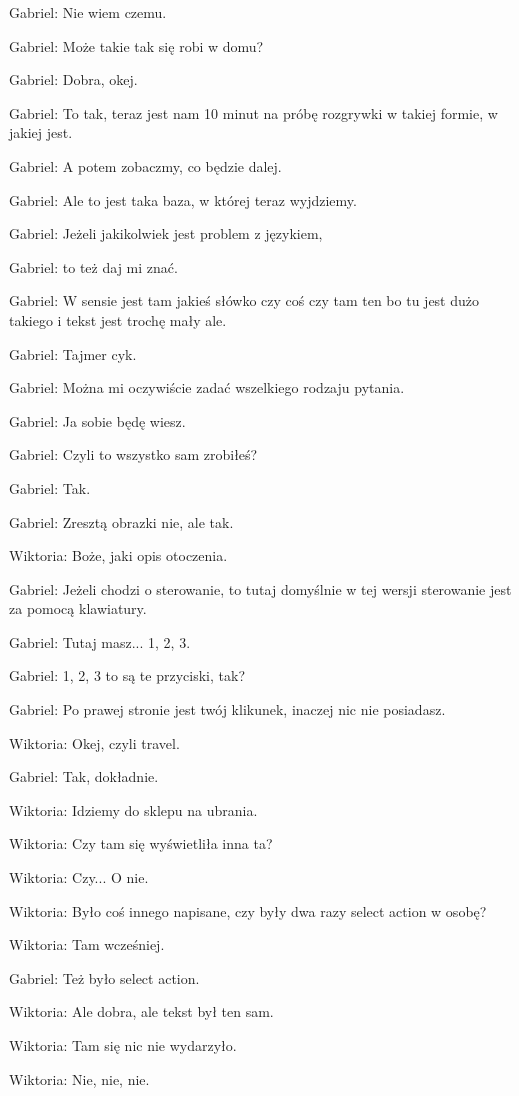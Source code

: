 Gabriel: Nie wiem czemu.

Gabriel: Może takie tak się robi w domu?

Gabriel: Dobra, okej.

Gabriel: To tak, teraz jest nam 10 minut na próbę rozgrywki w takiej formie, w jakiej jest.

Gabriel: A potem zobaczmy, co będzie dalej.

Gabriel: Ale to jest taka baza, w której teraz wyjdziemy.

Gabriel: Jeżeli jakikolwiek jest problem z językiem,

Gabriel: to też daj mi znać.

Gabriel: W sensie jest tam jakieś słówko czy coś czy tam ten bo tu jest dużo takiego i tekst jest trochę mały ale.

Gabriel: Tajmer cyk.

Gabriel: Można mi oczywiście zadać wszelkiego rodzaju pytania.

Gabriel: Ja sobie będę wiesz.

Gabriel: Czyli to wszystko sam zrobiłeś?

Gabriel: Tak.

Gabriel: Zresztą obrazki nie, ale tak.

Wiktoria: Boże, jaki opis otoczenia.

Gabriel: Jeżeli chodzi o sterowanie, to tutaj domyślnie w tej wersji sterowanie jest za pomocą klawiatury.

Gabriel: Tutaj masz... 1, 2, 3.

Gabriel: 1, 2, 3 to są te przyciski, tak?

Gabriel: Po prawej stronie jest twój klikunek, inaczej nic nie posiadasz.

Wiktoria: Okej, czyli travel.

Gabriel: Tak, dokładnie.

Wiktoria: Idziemy do sklepu na ubrania.

Wiktoria: Czy tam się wyświetliła inna ta?

Wiktoria: Czy... O nie.

Wiktoria: Było coś innego napisane, czy były dwa razy select action w osobę?

Wiktoria: Tam wcześniej.

Gabriel: Też było select action.

Wiktoria: Ale dobra, ale tekst był ten sam.

Wiktoria: Tam się nic nie wydarzyło.

Wiktoria: Nie, nie, nie.

